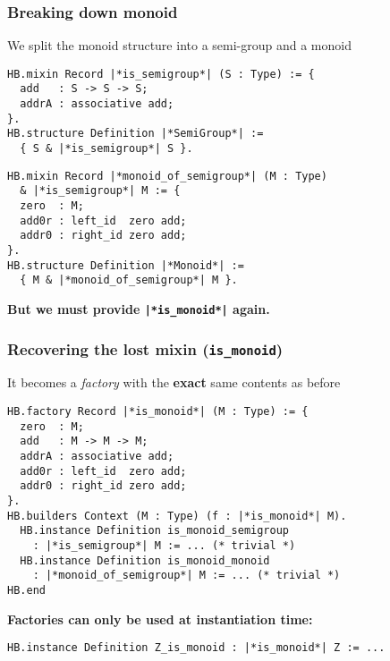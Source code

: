 \documentclass[11pt]{beamer}
\let\L=\lstinline
\begin{document}
\begin{frame}[fragile]
  \frametitle{Breaking down monoid}

  We split the monoid structure into a semi-group and a monoid
\begin{lstlisting}
HB.mixin Record |*is_semigroup*| (S : Type) := {
  add   : S -> S -> S;
  addrA : associative add;
}.
HB.structure Definition |*SemiGroup*| :=
  { S & |*is_semigroup*| S }.
\end{lstlisting}
\begin{lstlisting}
HB.mixin Record |*monoid_of_semigroup*| (M : Type)
  & |*is_semigroup*| M := {
  zero  : M;
  add0r : left_id  zero add;
  addr0 : right_id zero add;
}.
HB.structure Definition |*Monoid*| :=
  { M & |*monoid_of_semigroup*| M }.
\end{lstlisting}
  \begin{center}
    \textbf{But we must provide \L{|*is_monoid*|} again.}
  \end{center}
\end{frame}

\begin{frame}[fragile]
  \frametitle{Recovering the lost mixin (\L{is_monoid})}

  It becomes a \emph{factory} with the \textbf{exact} same contents as before
\begin{lstlisting}
HB.factory Record |*is_monoid*| (M : Type) := {
  zero  : M;
  add   : M -> M -> M;
  addrA : associative add;
  add0r : left_id  zero add;
  addr0 : right_id zero add;
}.
HB.builders Context (M : Type) (f : |*is_monoid*| M).
  HB.instance Definition is_monoid_semigroup
    : |*is_semigroup*| M := ... (* trivial *)
  HB.instance Definition is_monoid_monoid
    : |*monoid_of_semigroup*| M := ... (* trivial *)
HB.end
\end{lstlisting}
  \begin{center}
    \textbf{Factories can only be used at instantiation time:}
  \end{center}
\begin{lstlisting}
HB.instance Definition Z_is_monoid : |*is_monoid*| Z := ...
\end{lstlisting}
\end{frame}
\end{document}
